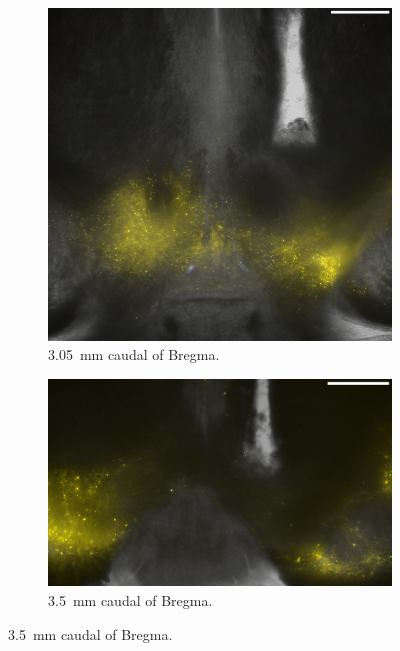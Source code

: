\begin{figure}[h!]
	\begin{subfigure}{.269\textwidth}
		\centering
		\includegraphics[width=\textwidth]{img/sub-6591_slice-b1_zoom-5_scene-3_transmission-yfp-comb_straight.png}
                \caption{\SI{3.05}{\milli\meter} caudal of Bregma.}
                \label{fig:h6591}
	\end{subfigure}
	\begin{subfigure}{.43\textwidth}
		\centering
		\includegraphics[width=\textwidth]{img/sub-6589_slice-a4_zoom-5_scene-2_transmission-yfp-comb_straight.png}
                \caption{\SI{3.5}{\milli\meter} caudal of Bregma.}

\end{subfigure}
\end{figure}
